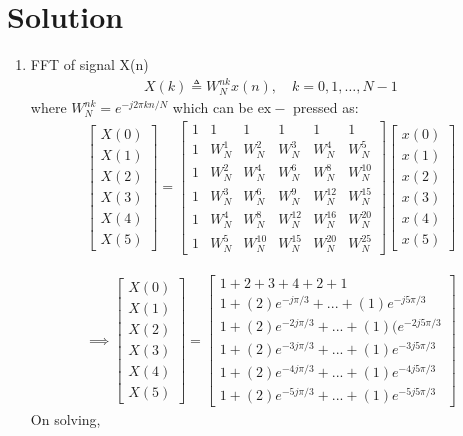 \documentclass[journal,12pt,twocolumn]{IEEEtran}
\renewcommand\thesection{\arabic{section}}
\begin{document}
\section{Solution}
\begin{enumerate}[label=\thesection.\arabic*.,ref=\thesection.\theenumi]
    \item FFT of signal X(n) 
    \begin{align}
        X(k) \triangleq W_{N}^{nk} x(n), \quad k=0,1, \ldots, N-1
        \label{eq:eq2}
    \end{align}
     where $W_{N}^{n k}=e^{-j 2 \pi k n / N}$ which can be $\mathrm{ex}-$ pressed as:
\begin{align}
\begin{bmatrix} X(0) \\ X(1) \\ X(2) \\ X(3) \\ X(4) \\ X(5) \end{bmatrix}
=
\begin{bmatrix}
1 & 1 & 1 & 1 & 1 & 1 \\ 1 & W_N^1& W_N^2& W_N^3 & W_N^4 & W_N^5\\1 & W_N^2 & W_N^4 & W_N^6 & W_N^8 & W_N^{10}\\1 & W_N^3 & W_N^6 & W_N^9 & W_N^{12} & W_N^{15}\\1 & W_N^4 & W_N^8 & W_N^{12} & W_N^{16} & W_N^{20}\\1 & W_N^5 & W_N^{10} & W_N^{15} & W_N^{20} &W_N^{25}
\end{bmatrix}%
\begin{bmatrix}
x(0) \\ x(1) \\ x(2) \\ x(3) \\ x(4) \\x(5)
\end{bmatrix}
\end{align}

\begin{align}
    \implies \begin{bmatrix} X(0) \\ X(1) \\ X(2) \\ X(3) \\ X(4) \\ X(5) \end{bmatrix}
         =
\begin{bmatrix}
1 +2+3+4+2+1 \\ 1+ (2)e^{-j\pi /3} + ... + (1)e^{-j5\pi /3}\\ 1 + (2)e^{-2j\pi /3} + ... +(1)(e^{-2j5\pi /3}\\ 1 + (2)e^{-3j\pi /3} + ... + (1)e^{-3j5\pi /3}\\ 1 + (2)e^{-4j\pi /3} + ... + (1)e^{-4j5\pi /3}\\ 1 + (2)e^{-5j\pi /3} + ... + (1)e^{-5j5\pi /3}
\end{bmatrix}
\end{align}
On solving,\\


\end{enumerate}
\end{document}
